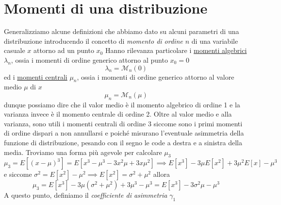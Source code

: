 \documentclass{report}
\begin{document}
\section{Momenti di una distribuzione}
Generalizziamo alcune definizioni che abbiamo dato su alcuni parametri di una distribuzione introducendo il concetto di \emph{momento di ordine $n$} di una variabile casuale $x$ attorno ad un punto $x_0$
\noindent Hanno rilevanza particolare i \underline{momenti algebrici} $\lambda_n$, ossia i momenti di ordine generico attorno al punto $x_0 = 0$
$$
	\lambda_n = \mathcal{M}_n(0)
$$
ed i \underline{momenti centrali} $\mu_n$, ossia i momenti di ordine generico attorno al valore medio $\mu$ di $x$
$$
	\mu_n = \mathcal{M}_n(\mu)
$$
dunque possiamo dire che il valor medio è il momento algebrico di ordine 1 e la varianza invece è il momento centrale di ordine 2. Oltre al valor medio e alla varianza, sono utili i momenti centrali di ordine 3 siccome sono i primi momenti di ordine dispari a non annullarsi e poiché misurano l'eventuale asimmetria della funzione di distribuzione, pesando con il segno le code a destra e a sinistra della media. Troviamo una forma più agevole per calcolare $\mu_3$
$$
	\mu_3 = E[(x-\mu)^3] = E [ x^3 - \mu^3 -3x^2 \mu + 3x \mu^2 ] \implies E[x^3] - 3\mu E[x^2] + 3\mu^2 E[x] - \mu^3
$$
e siccome $\sigma^2 = E[x^2] - \mu^2 \implies E[x^2] = \sigma^2 + \mu^2$ allora
$$
	\mu_3 = E[x^3] - 3 \mu (\sigma^2 + \mu^2) + 3 \mu^3 - \mu^3 = E[x^3] - 3 \sigma^2 \mu - \mu^3
$$
A questo punto, definiamo il \emph{coefficiente di asimmetria} $\gamma_1$
\end{document}
